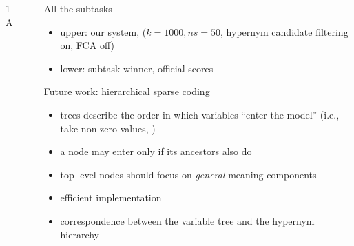 \documentclass{beamer}
\newlength{\sepwid}
\newlength{\onecolwid}
\begin{document}
\begin{frame}[t]
\begin{columns}[t]
\begin{column}{\onecolwid}
\begin{block}{1A}
    \end{block}
\end{column}


\begin{column}{\sepwid} %
\end{column}

\begin{column}{\onecolwid} %
      \begin{block}{All the subtasks}

        

        \begin{itemize}
          \item upper: our system, ($k = 1000, ns = 50$, hypernym candidate
            filtering on, FCA off) 
          \item lower: subtask winner, official scores 
        \end{itemize}


      \end{block}


  \begin{block}{Future work: hierarchical sparse coding}
    \begin{itemize}
      \item trees describe the order in which variables “enter the model”
        (i.e., take non-zero values, \cite{Zhao:2009})
      \item a node may enter only if its ancestors also do
      \item %
        top level nodes should focus on \emph{general} meaning components
      \item efficient implementation \citep{Yogatama:2015}
      \item correspondence between
        the variable tree and the hypernym hierarchy
    \end{itemize}
  \end{block}


\end{column}
\end{columns}
\end{frame}
\end{document}
